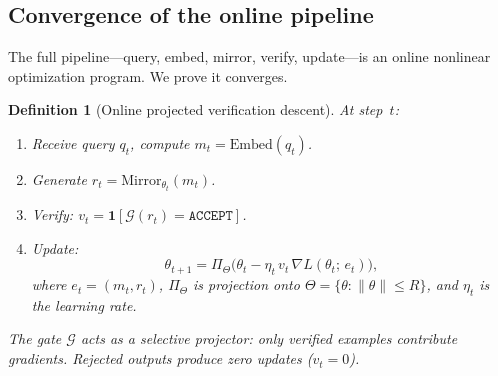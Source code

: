 \documentclass[11pt,a4paper]{article}
\newtheorem{definition}[theorem]{Definition}
\newcommand{\cG}{\mathcal{G}}
\newcommand{\Embed}{\mathrm{Embed}}
\newcommand{\Mirror}{\mathrm{Mirror}}
\begin{document}
\subsection{Convergence of the online pipeline}\label{sec:convergence}

The full pipeline---query, embed, mirror, verify, update---is
an online nonlinear optimization program.
We prove it converges.

\begin{definition}[Online projected verification descent]%
\label{def:opvd}
At step~$t$:
\begin{enumerate}[nosep]
\item Receive query $q_t$, compute $m_t = \Embed(q_t)$.
\item Generate $r_t = \Mirror_{\theta_t}(m_t)$.
\item Verify: $v_t = \mathbf{1}[\cG(r_t) = \texttt{ACCEPT}]$.
\item Update:
\begin{equation}\label{eq:opvd}
  \theta_{t+1} = \Pi_{\Theta}\!\bigl(
    \theta_t - \eta_t\, v_t\, \nabla L(\theta_t;\, e_t)
  \bigr),
\end{equation}
where $e_t = (m_t, r_t)$,
$\Pi_\Theta$ is projection onto
$\Theta = \{\theta : \|\theta\| \leq R\}$,
and $\eta_t$ is the learning rate.
\end{enumerate}
The gate $\cG$ acts as a selective projector:
only verified examples contribute gradients.
Rejected outputs produce zero updates ($v_t = 0$).
\end{definition}
\end{document}
